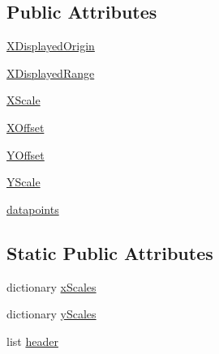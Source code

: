 \subsection*{Public Attributes}
\begin{DoxyCompactItemize}
\item 
\hyperlink{classsoftware_1_1chipwhisperer_1_1capture_1_1scopes_1_1visascope__interface_1_1mso54831D_1_1VisaScopeInterface__MSO54831D_ab0aec2268576e6e33008919ca2fca519}{X\+Displayed\+Origin}
\item 
\hyperlink{classsoftware_1_1chipwhisperer_1_1capture_1_1scopes_1_1visascope__interface_1_1mso54831D_1_1VisaScopeInterface__MSO54831D_a907c2c79d91e4696bce836fa11dbdc97}{X\+Displayed\+Range}
\item 
\hyperlink{classsoftware_1_1chipwhisperer_1_1capture_1_1scopes_1_1visascope__interface_1_1mso54831D_1_1VisaScopeInterface__MSO54831D_a4153e050a8d39dffd8732c9ef1cf2c03}{X\+Scale}
\item 
\hyperlink{classsoftware_1_1chipwhisperer_1_1capture_1_1scopes_1_1visascope__interface_1_1mso54831D_1_1VisaScopeInterface__MSO54831D_a77402160ebdb0f5ffdbe4f9256f1cf10}{X\+Offset}
\item 
\hyperlink{classsoftware_1_1chipwhisperer_1_1capture_1_1scopes_1_1visascope__interface_1_1mso54831D_1_1VisaScopeInterface__MSO54831D_a24746b067ca033736d1700da81efb91e}{Y\+Offset}
\item 
\hyperlink{classsoftware_1_1chipwhisperer_1_1capture_1_1scopes_1_1visascope__interface_1_1mso54831D_1_1VisaScopeInterface__MSO54831D_a3895857d0e8676b5ab2eb7b108c385dd}{Y\+Scale}
\item 
\hyperlink{classsoftware_1_1chipwhisperer_1_1capture_1_1scopes_1_1visascope__interface_1_1mso54831D_1_1VisaScopeInterface__MSO54831D_ad8b0f9d7110d3c5819beebe935fc8d16}{datapoints}
\end{DoxyCompactItemize}
\subsection*{Static Public Attributes}
\begin{DoxyCompactItemize}
\item 
dictionary \hyperlink{classsoftware_1_1chipwhisperer_1_1capture_1_1scopes_1_1visascope__interface_1_1mso54831D_1_1VisaScopeInterface__MSO54831D_ab4c3e1e90a0046e62019fb53eac84d02}{x\+Scales}
\item 
dictionary \hyperlink{classsoftware_1_1chipwhisperer_1_1capture_1_1scopes_1_1visascope__interface_1_1mso54831D_1_1VisaScopeInterface__MSO54831D_a32af1468fecc619a8b947fa2161c33ff}{y\+Scales}
\item 
list \hyperlink{classsoftware_1_1chipwhisperer_1_1capture_1_1scopes_1_1visascope__interface_1_1mso54831D_1_1VisaScopeInterface__MSO54831D_a4909ceac23c06a5f78beaca5c9fc11a4}{header}
\end{DoxyCompactItemize}


